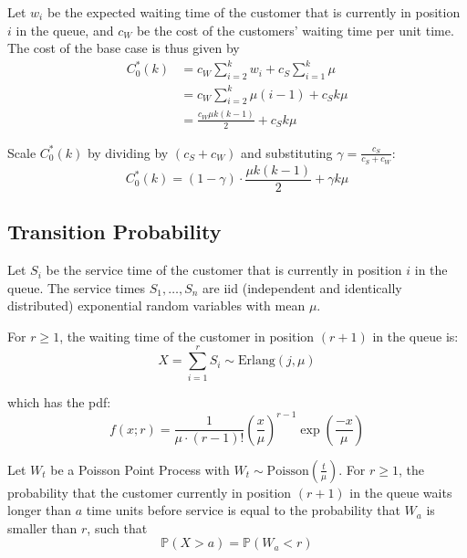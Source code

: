 Let $w_{i}$ be the expected waiting time of the customer that is currently in position $i$ in the queue, and $c_{W}$ be the cost of the customers' waiting time per unit time. The cost of the base case is thus given by
\begin{align*}
 	C_{0}^{*} (k) & = c_{W} \sum_{i = 2}^{k} w_{i} + c_{S} \sum_{i = 1}^{k} \mu \\
 	& = c_{W} \sum_{i = 2}^{k} \mu (i - 1) + c_{S} k \mu \\
 	& = \frac{c_{W} \mu k (k - 1)}{2} + c_{S} k \mu
\end{align*}

Scale $C_{0}^{*} (k)$ by dividing by $(c_{S} + c_{W})$ and substituting $\gamma = \frac{c_{S}}{c_{S} + c_{W}}$:
\begin{equation}
	C_{0}^{*} (k) = (1 - \gamma) \cdot \frac{\mu k (k - 1)}{2} + \gamma k \mu
\end{equation}

\subsection{Transition Probability}

Let $S_{i}$ be the service time of the customer that is currently in position $i$ in the queue. The service times $S_{1}, \ldots, S_{n}$ are iid (independent and identically distributed) exponential random variables with mean $\mu$.

For $r \geq 1$, the waiting time of the customer in position $(r + 1)$ in the queue is:
\begin{equation}
	X = \sum_{i = 1}^{r} S_{i} \sim \text{Erlang}(j, \mu)
\end{equation}

which has the pdf:
\begin{equation}
	f (x; r) = \frac{1}{\mu \cdot (r - 1)!} \left( \frac{x}{\mu} \right)^{r - 1} \exp \left( \frac{-x}{\mu} \right)
\end{equation}

Let $W_{t}$ be a Poisson Point Process with $W_{t} \sim \text{Poisson} \left( \frac{t}{\mu} \right)$. For $r \geq 1$, the probability that the customer currently in position $(r + 1)$ in the queue waits longer than $a$ time units before service is equal to the probability that $W_{a}$ is smaller than $r$, such that
\begin{equation}
	\mathbb{P} (X > a) = \mathbb{P} (W_{a} < r)
\end{equation}


